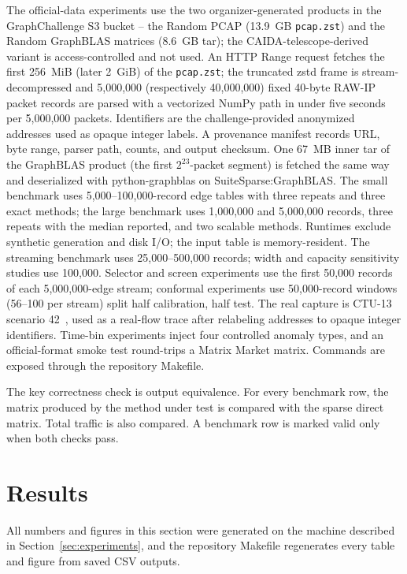 \documentclass[conference]{IEEEtran}
\begin{document}
The official-data experiments use the two organizer-generated products in the GraphChallenge S3 bucket -- the Random PCAP (13.9~GB \texttt{pcap.zst}) and the Random GraphBLAS matrices (8.6~GB tar); the CAIDA-telescope-derived variant is access-controlled and not used. An HTTP Range request fetches the first 256~MiB (later 2~GiB) of the \texttt{pcap.zst}; the truncated zstd frame is stream-decompressed and 5{,}000{,}000 (respectively 40{,}000{,}000) fixed 40-byte RAW-IP packet records are parsed with a vectorized NumPy path in under five seconds per 5{,}000{,}000 packets. Identifiers are the challenge-provided anonymized addresses used as opaque integer labels. A provenance manifest records URL, byte range, parser path, counts, and output checksum. One 67~MB inner tar of the GraphBLAS product (the first $2^{23}$-packet segment) is fetched the same way and deserialized with python-graphblas on SuiteSparse:GraphBLAS. The small benchmark uses 5,000--100,000-record edge tables with three repeats and three exact methods; the large benchmark uses 1,000,000 and 5,000,000 records, three repeats with the median reported, and two scalable methods. Runtimes exclude synthetic generation and disk I/O; the input table is memory-resident. The streaming benchmark uses 25,000--500,000 records; width and capacity sensitivity studies use 100,000. Selector and screen experiments use the first 50,000 records of each 5,000,000-edge stream; conformal experiments use 50,000-record windows (56--100 per stream) split half calibration, half test. The real capture is CTU-13 scenario 42~\cite{garcia2014empirical}, used as a real-flow trace after relabeling addresses to opaque integer identifiers. Time-bin experiments inject four controlled anomaly types, and an official-format smoke test round-trips a Matrix Market matrix. Commands are exposed through the repository Makefile.

The key correctness check is output equivalence. For every benchmark row, the matrix produced by the method under test is compared with the sparse direct matrix. Total traffic is also compared. A benchmark row is marked valid only when both checks pass.

\section{Results}
\label{sec:results}
All numbers and figures in this section were generated on the machine described in Section~\ref{sec:experiments}, and the repository Makefile regenerates every table and figure from saved CSV outputs.
\end{document}
